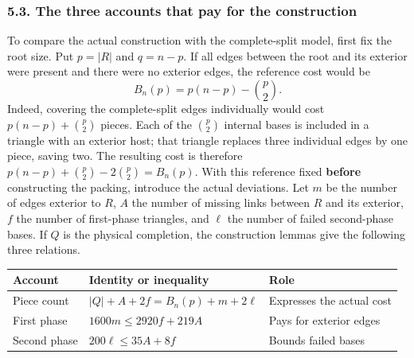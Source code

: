 \documentclass[english,11pt,a4paper]{article}
\newcounter{none}
\begin{document}
\subsubsection{5.3. The three accounts that pay for the construction}\label{the-three-accounts-that-pay-for-the-construction}

To compare the actual construction with the complete-split model, first fix the root size. Put \(p=|R|\) and \(q=n-p\). If all edges between the root and its exterior were present and there were no exterior edges, the reference cost would be \[
B_n(p)=p(n-p)-\binom p2.
\] Indeed, covering the complete-split edges individually would cost \(p(n-p)+\binom p2\) pieces. Each of the \(\binom p2\) internal bases is included in a triangle with an exterior host; that triangle replaces three individual edges by one piece, saving two. The resulting cost is therefore \(p(n-p)+\binom p2-2\binom p2=B_n(p)\). With this reference fixed \textbf{before} constructing the packing, introduce the actual deviations. Let \(m\) be the number of edges exterior to \(R\), \(A\) the number of missing links between \(R\) and its exterior, \(f\) the number of first-phase triangles, and \(\ell\) the number of failed second-phase bases. If \(Q\) is the physical completion, the construction lemmas give the following three relations.


{\def\LTcaptype{none} %
\begin{longtable}[c]{@{}
  >{\raggedright\arraybackslash}p{}
  >{\raggedright\arraybackslash}p{}
  >{\raggedright\arraybackslash}p{}@{}}
\toprule\noalign{}
\begin{minipage}[b]{\linewidth}\raggedright
Account
\end{minipage} & \begin{minipage}[b]{\linewidth}\raggedright
Identity or inequality
\end{minipage} & \begin{minipage}[b]{\linewidth}\raggedright
Role
\end{minipage} \\
\midrule\noalign{}
\endhead
\bottomrule\noalign{}
\endlastfoot
Piece count & \(|Q|+A+2f=B_n(p)+m+2\ell\) & Expresses the actual cost \\
First phase & \(1600m\le2920f+219A\) & Pays for exterior edges \\
Second phase & \(200\ell\le35A+8f\) & Bounds failed bases \\
\end{longtable}
}
\end{document}
